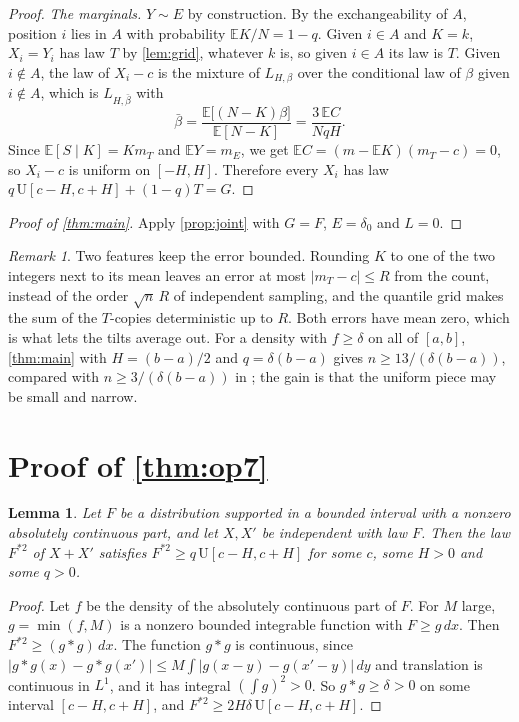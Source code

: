 ﻿\documentclass[11pt]{amsart}
\newtheorem{lemma}[theorem]{Lemma}
\theoremstyle{remark}
\newtheorem{remark}[theorem]{Remark}
\newcommand{\E}{\mathbb{E}}
\newcommand{\U}{\mathrm{U}}
\begin{document}
\begin{proof}
\emph{The marginals.} $Y\sim E$ by construction. By the exchangeability of $A$, position $i$ lies in $A$ with probability $\E K/N=1-q$. Given $i\in A$ and $K=k$, $X_i=Y_i$ has law $T$ by \cref{lem:grid}, whatever $k$ is, so given $i\in A$ its law is $T$. Given $i\notin A$, the law of $X_i-c$ is the mixture of $L_{H,\beta}$ over the conditional law of $\beta$ given $i\notin A$, which is $L_{H,\bar\beta}$ with
\[
\bar\beta=\frac{\E\bigl[(N-K)\beta\bigr]}{\E[N-K]}=\frac{3\,\E C}{NqH}.
\]
Since $\E[S\mid K]=Km_T$ and $\E Y=m_E$, we get $\E C=(m-\E K)(m_T-c)=0$, so $X_i-c$ is uniform on $[-H,H]$. Therefore every $X_i$ has law $q\,\U[c-H,c+H]+(1-q)T=G$.
\end{proof}

\begin{proof}[Proof of \cref{thm:main}]
Apply \cref{prop:joint} with $G=F$, $E=\delta_0$ and $L=0$.
\end{proof}

\begin{remark}
Two features keep the error bounded. Rounding $K$ to one of the two integers next to its mean leaves an error at most $|m_T-c|\le R$ from the count, instead of the order $\sqrt n\,R$ of independent sampling, and the quantile grid makes the sum of the $T$-copies deterministic up to $R$. Both errors have mean zero, which is what lets the tilts average out. For a density with $f\ge\delta$ on all of $[a,b]$, \cref{thm:main} with $H=(b-a)/2$ and $q=\delta(b-a)$ gives $n\ge13/(\delta(b-a))$, compared with $n\ge3/(\delta(b-a))$ in \cite{PWW13}; the gain is that the uniform piece may be small and narrow.
\end{remark}

\section{Proof of \texorpdfstring{\cref{thm:op7}}{Theorem 1.1}}

\begin{lemma}\label{lem:conv}
Let $F$ be a distribution supported in a bounded interval with a nonzero absolutely continuous part, and let $X,X'$ be independent with law $F$. Then the law $F^{*2}$ of $X+X'$ satisfies $F^{*2}\ge q\,\U[c-H,c+H]$ for some $c$, some $H>0$ and some $q>0$.
\end{lemma}

\begin{proof}
Let $f$ be the density of the absolutely continuous part of $F$. For $M$ large, $g=\min(f,M)$ is a nonzero bounded integrable function with $F\ge g\,dx$. Then $F^{*2}\ge (g*g)\,dx$. The function $g*g$ is continuous, since $|g*g(x)-g*g(x')|\le M\int|g(x-y)-g(x'-y)|\,dy$ and translation is continuous in $L^1$, and it has integral $(\int g)^2>0$. So $g*g\ge\delta>0$ on some interval $[c-H,c+H]$, and $F^{*2}\ge 2H\delta\,\U[c-H,c+H]$.
\end{proof}
\end{document}
